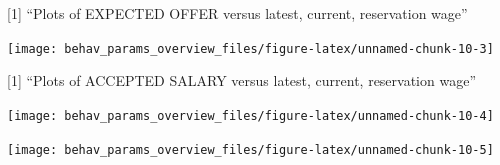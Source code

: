 \documentclass[
]{article}
\begin{document}
{[}1{]} ``Plots of EXPECTED OFFER versus latest, current, reservation
wage''

\begin{center}\texttt{[image: behav\_params\_overview\_files/figure-latex/unnamed-chunk-10-3]} \end{center}

{[}1{]} ``Plots of ACCEPTED SALARY versus latest, current, reservation
wage''

\begin{center}\texttt{[image: behav\_params\_overview\_files/figure-latex/unnamed-chunk-10-4]} \end{center}

\begin{center}\texttt{[image: behav\_params\_overview\_files/figure-latex/unnamed-chunk-10-5]} \end{center}
\end{document}
